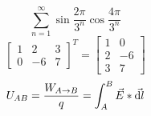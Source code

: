 \documentclass[11pt,a4paper]{article}
\begin{document}
$$
\sum_{n=1}^{\infty}\sin \frac{2{\pi}}{3^{n}} \cos \frac{4{\pi}}{3^{n}}
$$
\newline
$$
\left[
\begin{array}{lll}
1 & 2 & 3\\
0 & -6 & 7
\end{array}
\right]^{T} 
=
\left[
\begin{array}{ll}
1 & 0\\
2 & -6\\
3 & 7
\end{array}
\right]
$$
\newline
$$
U_{AB} = \frac {W_{A \rightarrow B}}{q} = \int_{A}^{B} \vec{E} * \vec{{\rm d}l}
$$
\end{document}
